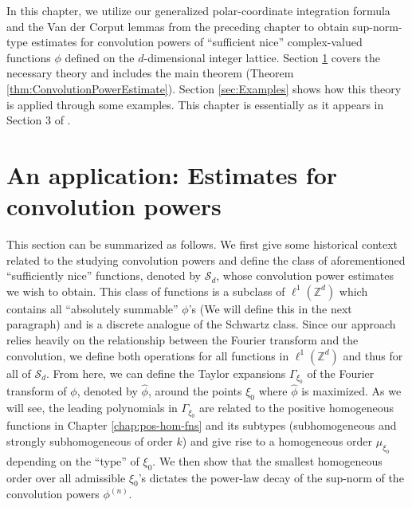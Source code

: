 \documentclass[11pt, letter]{book}
\begin{document}
In this chapter, we utilize our generalized polar-coordinate integration formula and the Van der Corput lemmas from the preceding chapter to obtain sup-norm-type estimates for convolution powers of ``sufficient nice'' complex-valued functions $\phi$ defined on the $d$-dimensional integer lattice. Section \ref{sec:ConvolutionPowers} covers the necessary theory and includes the main theorem (Theorem \ref{thm:ConvolutionPowerEstimate}). Section \ref{sec:Examples} shows how this theory is applied through some examples. This chapter is essentially as it appears in Section 3 of \cite{bui2021generalized}.\\





\section{An application: Estimates for convolution powers}\label{sec:ConvolutionPowers}

This section can be summarized as follows. We first give some historical context related to the studying convolution powers and define the class of aforementioned ``sufficiently nice'' functions, denoted by $\mathcal{S}_d$, whose convolution power estimates we wish to obtain. This class of functions is a subclass of $\ell^1(\mathbb{Z}^d)$ which contains all ``absolutely summable'' $\phi$'s (We will define this in the next paragraph) and is a discrete analogue of the Schwartz class. Since our approach relies heavily on the relationship between the Fourier transform and the convolution, we define both operations for all functions in $\ell^1(\mathbb{Z}^d)$ and thus for all of $\mathcal{S}_d$.  From here, we can define the Taylor expansions $\Gamma_{\xi_0}$ of the Fourier transform of $\phi$, denoted by $\widehat{\phi}$, around the points $\xi_0$ where $\widehat{\phi}$ is maximized. As we will see, the leading polynomials in $\Gamma_{\xi_0}$ are related to the positive homogeneous functions in Chapter \ref{chap:pos-hom-fns} and its subtypes (subhomogeneous and strongly subhomogeneous of order $k$) and give rise to a homogeneous order $\mu_{\xi_0}$ depending on the ``type'' of $\xi_0$. We then show that the smallest homogeneous order over all admissible $\xi_0$'s dictates the power-law decay of the sup-norm of the convolution powers $\phi^{(n)}$.\\
\end{document}
